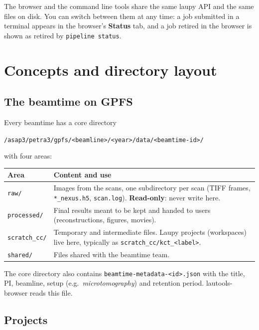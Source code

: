 \documentclass[11pt,a4paper]{article}
\newcommand{\cmd}[1]{\texttt{#1}}
\newcommand{\ui}[1]{\textsf{\textbf{#1}}}
\begin{document}
The browser and the command line tools share the same laupy API and the same files on disk.
You can switch between them at any time: a job submitted in a terminal appears in the
browser's \ui{Status} tab, and a job retired in the browser is shown as retired by
\cmd{pipeline status}.

\section{Concepts and directory layout}

\subsection{The beamtime on GPFS}

Every beamtime has a core directory
\begin{center}\cmd{/asap3/petra3/gpfs/<beamline>/<year>/data/<beamtime-id>/}\end{center}
with four areas:

\begin{center}
\begin{tabularx}{\linewidth}{@{}l>{\raggedright\arraybackslash}X@{}}
\toprule
Area & Content and use \\
\midrule
\cmd{raw/} & Images from the scans, one subdirectory per scan (TIFF frames, \cmd{*\_nexus.h5}, \cmd{scan.log}). \textbf{Read-only}: never write here. \\
\cmd{processed/} & Final results meant to be kept and handed to users (reconstructions, figures, movies). \\
\cmd{scratch\_cc/} & Temporary and intermediate files. Laupy projects (workspaces) live here, typically as \cmd{scratch\_cc/kct\_<label>}. \\
\cmd{shared/} & Files shared with the beamtime team. \\
\bottomrule
\end{tabularx}
\end{center}

The core directory also contains \cmd{beamtime-metadata-<id>.json} with the title, PI, beamline,
setup (e.g.\ \emph{microtomography}) and retention period. lautools-browser reads this file.

\subsection{Projects}
\end{document}
